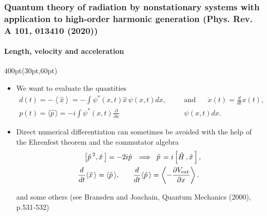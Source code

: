 \begin{frame}
\frametitle{Quantum theory of radiation by nonstationary systems 
	with application to high-order harmonic generation
        (Phys. Rev. A 101, 013410 (2020))}
	\framesubtitle{Length, velocity and acceleration}

\begin{textblock*}{400pt}(30pt,60pt)
\footnotesize
\begin{itemize}
\item We want to evaluate the quantities
\begin{align}
d(t) = - \left\langle\hat{x}\right\rangle
	= - \int \psi^{*}(x,t)\hat{x}\,\psi(x,t)dx, \hspace{20pt}&\mbox{and}
	\hspace{20pt} \dot{x}(t) = \frac{d}{dt} x(t), \\
p(t) = \langle \hat{p\,} \rangle  
	 = - i\int \psi^{*}(x,t)\frac{\partial}{\partial x} &\psi(x,t)  dx.
\end{align}
\item Direct numerical differentiation can sometimes be avoided 
	with the help of the Ehrenfest theorem 
	and the commutator algebra
\begin{align}
	\left[ \hat{p\,}^2,\hat{x\,}\right] = -2i\hat{p\,} 
	&\;\;\Longrightarrow\;\;
	\hat{p\,} = i\left[ \hat{H\,},\hat{x\,}\right] 
	\label{eqn:commutator_alg}, 	\\
        \frac{d}{dt}\langle \hat{x\,} \rangle 
	 = \langle \hat{p\,} \rangle, \hspace{20pt}& 
	\frac{d}{dt} \langle \hat{p\,}\rangle 
	= \left\langle -\frac{\partial V_{\rm ext}}{\partial x} \right\rangle.
	\label{eqn:ehrenfest}
\end{align}

   and some others 
   (see Bransden and Joachain, Quantum Mechanics (2000), p.531-532) 

\end{itemize}
\end{textblock*}


\end{frame}









